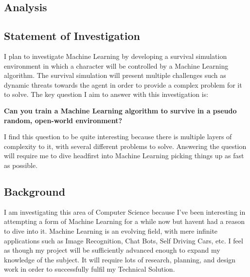 \begin{flushleft}
    \Large
    \section{Analysis}

        \subsection{Statement of Investigation}
            \large
            \vspace{0.2cm}
            I plan to investigate Machine Learning by developing a survival simulation environment 
            in which a character will be controlled by a Machine Learning algorithm. The survival simulation will 
            present multiple challenges such as dynamic threats towards the agent in order to provide a complex 
            problem for it to solve. The key question I aim to answer with this investigation is:

            \vspace{0.3cm}

            \begin{center}
            \textbf{Can you train a Machine Learning algorithm to survive in a pseudo random, open-world environment?}
            \end{center}

            \vspace{0.3cm}

            I find this question to be quite interesting because there is multiple layers of complexity to it, 
            with several different problems to solve. Answering the question will require me to dive headfirst into 
            Machine Learning picking things up as fast as possible.

        \vspace{1cm}
        \subsection{Background}
            \vspace{0.2cm}
            I am investigating this area of Computer Science because I've been interesting in attempting a form of
            Machine Learning for a while now but havent had a reason to dive into it. Machine Learning is an evolving
            field, with mere infinite applications such as Image Recognition, Chat Bots, Self Driving Cars, 
            etc. I feel as though my project will be sufficiently advanced enough to expand my knowledge of the subject.
            It will require lots of research, planning, and design work in order to successfully fulfil my Technical
            Solution. \\
            \vspace{0.2cm}


\end{flushleft}
